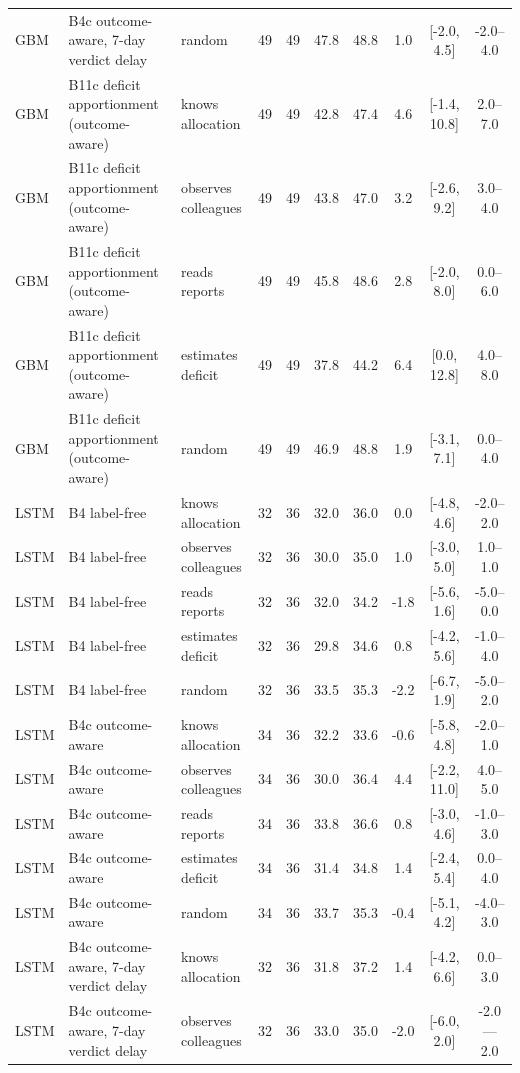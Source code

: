 \begin{table}[!t]
\begin{tabular}{lllccccccc}
GBM & B4c outcome-aware, 7-day verdict delay & random & 49 & 49 & 47.8 & 48.8 & 1.0 & [-2.0, 4.5] & -2.0--4.0 \\
GBM & B11c deficit apportionment (outcome-aware) & knows allocation & 49 & 49 & 42.8 & 47.4 & 4.6 & [-1.4, 10.8] & 2.0--7.0 \\
GBM & B11c deficit apportionment (outcome-aware) & observes colleagues & 49 & 49 & 43.8 & 47.0 & 3.2 & [-2.6, 9.2] & 3.0--4.0 \\
GBM & B11c deficit apportionment (outcome-aware) & reads reports & 49 & 49 & 45.8 & 48.6 & 2.8 & [-2.0, 8.0] & 0.0--6.0 \\
GBM & B11c deficit apportionment (outcome-aware) & estimates deficit & 49 & 49 & 37.8 & 44.2 & 6.4 & [0.0, 12.8] & 4.0--8.0 \\
GBM & B11c deficit apportionment (outcome-aware) & random & 49 & 49 & 46.9 & 48.8 & 1.9 & [-3.1, 7.1] & 0.0--4.0 \\
LSTM & B4 label-free & knows allocation & 32 & 36 & 32.0 & 36.0 & 0.0 & [-4.8, 4.6] & -2.0--2.0 \\
LSTM & B4 label-free & observes colleagues & 32 & 36 & 30.0 & 35.0 & 1.0 & [-3.0, 5.0] & 1.0--1.0 \\
LSTM & B4 label-free & reads reports & 32 & 36 & 32.0 & 34.2 & -1.8 & [-5.6, 1.6] & -5.0--0.0 \\
LSTM & B4 label-free & estimates deficit & 32 & 36 & 29.8 & 34.6 & 0.8 & [-4.2, 5.6] & -1.0--4.0 \\
LSTM & B4 label-free & random & 32 & 36 & 33.5 & 35.3 & -2.2 & [-6.7, 1.9] & -5.0--2.0 \\
LSTM & B4c outcome-aware & knows allocation & 34 & 36 & 32.2 & 33.6 & -0.6 & [-5.8, 4.8] & -2.0--1.0 \\
LSTM & B4c outcome-aware & observes colleagues & 34 & 36 & 30.0 & 36.4 & 4.4 & [-2.2, 11.0] & 4.0--5.0 \\
LSTM & B4c outcome-aware & reads reports & 34 & 36 & 33.8 & 36.6 & 0.8 & [-3.0, 4.6] & -1.0--3.0 \\
LSTM & B4c outcome-aware & estimates deficit & 34 & 36 & 31.4 & 34.8 & 1.4 & [-2.4, 5.4] & 0.0--4.0 \\
LSTM & B4c outcome-aware & random & 34 & 36 & 33.7 & 35.3 & -0.4 & [-5.1, 4.2] & -4.0--3.0 \\
LSTM & B4c outcome-aware, 7-day verdict delay & knows allocation & 32 & 36 & 31.8 & 37.2 & 1.4 & [-4.2, 6.6] & 0.0--3.0 \\
LSTM & B4c outcome-aware, 7-day verdict delay & observes colleagues & 32 & 36 & 33.0 & 35.0 & -2.0 & [-6.0, 2.0] & -2.0---2.0 \\

\end{tabular}
\end{table}
